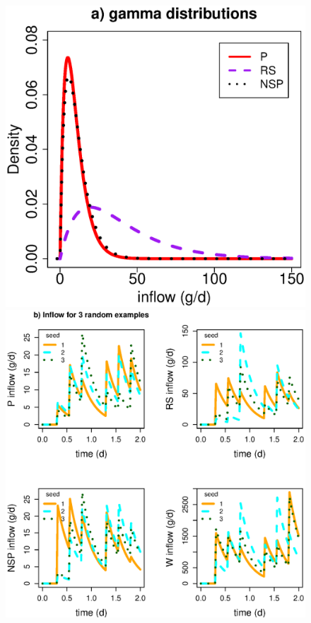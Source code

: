 \documentclass[a4paper]{article}
\begin{document}
\begin{figure}
    \centering
    \includegraphics[scale=0.25]{images/inflowGamma.eps}
    \includegraphics[scale=0.4]{images/inflowTS.eps}

\end{figure}
\end{document}
